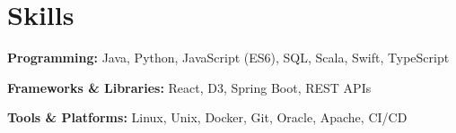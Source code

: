 \section{Skills}

\begin{onecolentry}
    \textbf{Programming:} Java, Python, JavaScript (ES6), SQL, Scala, Swift, TypeScript
\end{onecolentry}

\vspace{0.2cm}

\begin{onecolentry}
    \textbf{Frameworks \& Libraries:} React, D3, Spring Boot, REST APIs
\end{onecolentry}

\vspace{0.2cm}

\begin{onecolentry}
    \textbf{Tools \& Platforms:} Linux, Unix, Docker, Git, Oracle, Apache, CI/CD
\end{onecolentry}
